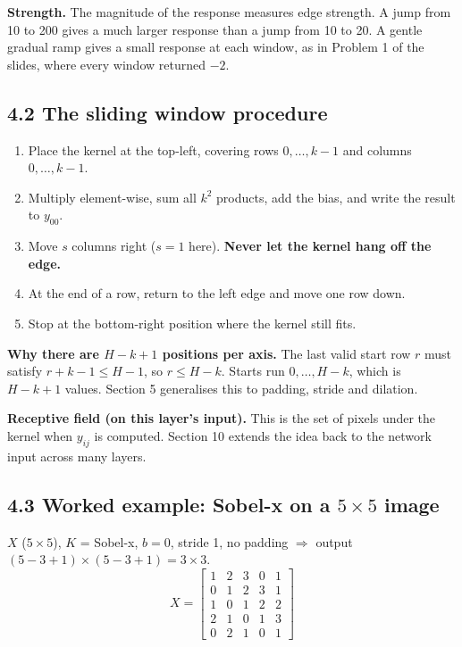 \textbf{Strength.} The magnitude of the response measures edge strength. A jump from 10 to 200 gives a much larger response than a jump from 10 to 20. A gentle gradual ramp gives a small response at each window, as in Problem 1 of the slides, where every window returned $-2$.

\subsection*{4.2 The sliding window procedure}

\begin{enumerate}[nosep]
  \item Place the kernel at the top-left, covering rows $0,\dots,k-1$ and columns $0,\dots,k-1$.
  \item Multiply element-wise, sum all $k^2$ products, add the bias, and write the result to $y_{00}$.
  \item Move $s$ columns right ($s=1$ here). \textbf{Never let the kernel hang off the edge.}
  \item At the end of a row, return to the left edge and move one row down.
  \item Stop at the bottom-right position where the kernel still fits.
\end{enumerate}

\textbf{Why there are $H-k+1$ positions per axis.} The last valid start row $r$ must satisfy $r+k-1 \le H-1$, so $r \le H-k$. Starts run $0,\dots,H-k$, which is $H-k+1$ values. Section 5 generalises this to padding, stride and dilation.

\textbf{Receptive field (on this layer's input).} This is the set of pixels under the kernel when $y_{ij}$ is computed. Section 10 extends the idea back to the network input across many layers.

\subsection*{4.3 Worked example: Sobel-x on a $5\times5$ image}

$X$ ($5\times5$), $K$ = Sobel-x, $b=0$, stride 1, no padding $\Rightarrow$ output $(5-3+1)\times(5-3+1) = 3\times3$.
\[
X = \begin{bmatrix}1&2&3&0&1\\0&1&2&3&1\\1&0&1&2&2\\2&1&0&1&3\\0&2&1&0&1\end{bmatrix}
\]

